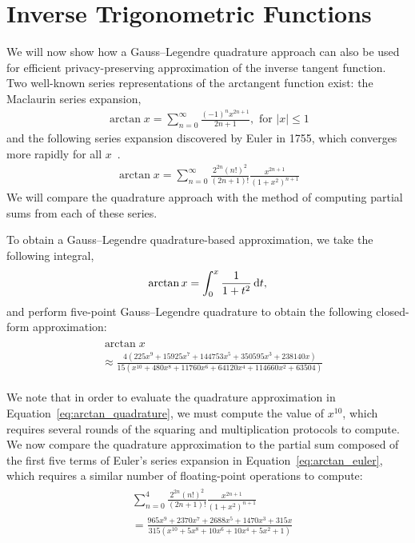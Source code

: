 \section{Inverse Trigonometric Functions}
We will now show how a Gauss--Legendre quadrature approach can also be used for efficient privacy-preserving approximation of the inverse tangent function. Two well-known series representations of the arctangent function exist: the Maclaurin series expansion,
\begin{align} \label{eq:arctan_maclaurin}
	\arctan x = \sum_{n=0}^{\infty}{\frac{(-1)^nx^{2n+1}}{2n+1}}, \text{ for }|x|\leq 1
\end{align}
and the following series expansion discovered by Euler in 1755, which converges more rapidly for all $x$~\cite{chien-lih_89.67_2005}.
\begin{align} \label{eq:arctan_euler}
	\arctan x = \sum_{n=0}^{\infty}
	{
	\frac
		{2^{2n}(n!)^2}
		{(2n+1)!}
	\frac
		{x^{2n+1}}
		{(1+x^2)^{n+1}}
	}
\end{align}
We will compare the quadrature approach with the method of computing partial sums from each of these series.

To obtain a Gauss--Legendre quadrature-based approximation, we take the following integral,
\begin{align*}
	\arctan x = \int_0^x{\frac{1}{1+t^2}\mathop{}\!\mathrm{d} t},
\end{align*}
and perform five-point Gauss--Legendre quadrature to obtain the following closed-form approximation:
\begin{align} \label{eq:arctan_quadrature}
	\begin{split}
		&\arctan x \\
		&\approx \frac
		{4\left(225x^9 + 15925x^7 + 144753x^5 + 350595x^3 + 238140x\right)}
		{15\left(x^{10} + 480x^8 + 11760x^6 + 64120x^4 + 114660x^2 + 63504\right)}
	\end{split}
\end{align}

We note that in order to evaluate the quadrature approximation in Equation~\ref{eq:arctan_quadrature}, we must compute the value of $x^{10}$, which requires several rounds of the squaring and multiplication protocols to compute. We now compare the quadrature approximation to the partial sum composed of the first five terms of Euler's series expansion in Equation~\ref{eq:arctan_euler}, which requires a similar number of floating-point operations to compute:
\begin{align} \label{eq:arctan_euler_partial}
	\begin{split}
		&\sum_{n=0}^{4}
		{
		\frac
			{2^{2n}(n!)^2}
			{(2n+1)!}
		\frac
			{x^{2n+1}}
			{(1+x^2)^{n+1}}
		}\\
		&= \frac
		{965x^9 + 2370x^7 + 2688x^5 + 1470x^3 + 315x}
		{315\left(x^{10} + 5x^8 + 10x^6 + 10x^4 + 5x^2 + 1\right)}
	\end{split}
\end{align}

